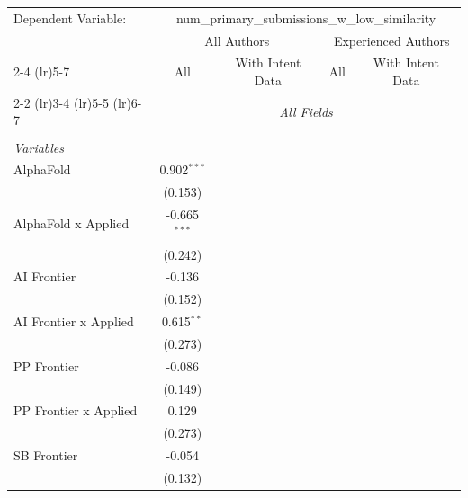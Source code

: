 \begingroup
\centering
\begin{tabular}{lcccccc}
   \tabularnewline \midrule \midrule
   Dependent Variable: & \multicolumn{6}{c}{num\_primary\_submissions\_w\_low\_similarity}\\
 & \multicolumn{3}{c}{All Authors} & \multicolumn{3}{c}{Experienced Authors} \\
\cmidrule(lr){2-4} \cmidrule(lr){5-7}
 & \multicolumn{1}{c}{All} & \multicolumn{2}{c}{With Intent Data} & \multicolumn{1}{c}{All} & \multicolumn{2}{c}{With Intent Data} \\
\cmidrule(lr){2-2} \cmidrule(lr){3-4} \cmidrule(lr){5-5} \cmidrule(lr){6-7}
 & \multicolumn{6}{c}{\textit{All Fields}} \\ \\
   \emph{Variables}\\
   AlphaFold             & 0.902$^{***}$  &           &           &        &        &   \\   
                         & (0.153)        &           &           &        &        &   \\   
   AlphaFold x Applied   & -0.665$^{***}$ &           &           &        &        &   \\   
                         & (0.242)        &           &           &        &        &   \\   
   AI Frontier           & -0.136         &           &           &        &        &   \\   
                         & (0.152)        &           &           &        &        &   \\   
   AI Frontier x Applied & 0.615$^{**}$   &           &           &        &        &   \\   
                         & (0.273)        &           &           &        &        &   \\   
   PP Frontier           & -0.086         &           &           &        &        &   \\   
                         & (0.149)        &           &           &        &        &   \\   
   PP Frontier x Applied & 0.129          &           &           &        &        &   \\   
                         & (0.273)        &           &           &        &        &   \\   
   SB Frontier           & -0.054         &           &           &        &        &   \\   
                         & (0.132)        &           &           &        &        &   \\   

\end{tabular}
